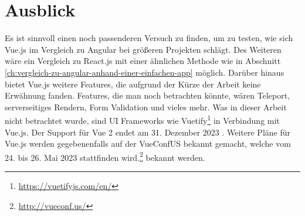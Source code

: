 

\chapter{Ausblick}
Es ist sinnvoll einen noch passenderen Versuch zu finden, um zu testen,
wie sich Vue.js im Vergleich zu Angular bei größeren Projekten schlägt.
Des Weiteren wäre ein Vergleich zu React.js mit einer ähnlichen Methode wie in Abschnitt \ref{ch:vergleich-zu-angular-anhand-einer-einfachen-app} möglich.
Darüber hinaus bietet Vue.js weitere Features, die aufgrund der Kürze der Arbeit keine Erwähnung fanden.
Features, die man noch betrachten könnte, wären Teleport, serverseitiges Rendern, Form Validation und vieles mehr.
Was in dieser Arbeit nicht betrachtet wurde, sind UI Frameworks wie Vuetify\footnote{\url{https://vuetifyjs.com/en/}} in Verbindung mit Vue.js.
Der Support für Vue 2 endet am 31. Dezember 2023 \cite{vueFAQ}.
Weitere Pläne für Vue.js werden gegebenenfalls auf der VueConfUS bekannt gemacht, welche vom 24. bis 26. Mai 2023 stattfinden wird.\footnote{\url{http://vueconf.us/}} bekannt werden.